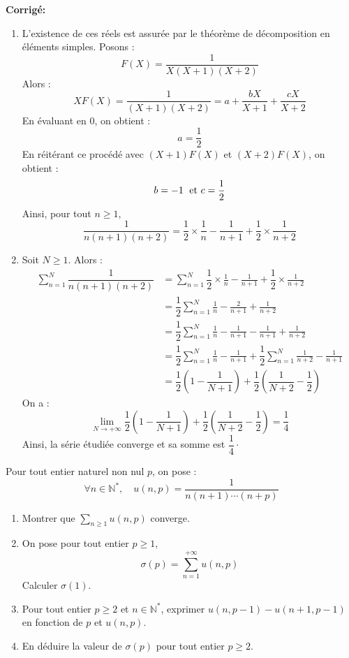 \documentclass[a4paper,twoside,french,10pt]{VcCours}
\newcommand{\corr}{\textbf{Corrigé:}}
\newcommand{\Sum}[2]{\ensuremath{\textstyle{\sum\limits_{#1}^{#2}}}}
\begin{document}
\corr 
\begin{enumerate}
\item L'existence de ces réels est assurée par le théorème de décomposition en éléments simples. Posons :
$$ F(X) = \dfrac{1}{X(X+1)(X+2)}$$
Alors :
$$ XF(X) = \dfrac{1}{(X+1)(X+2)} = a + \dfrac{bX}{X+1} + \dfrac{cX}{X+2}$$
En évaluant en $0$, on obtient :
$$ a = \dfrac{1}{2}$$
En réitérant ce procédé avec $(X+1)F(X)$ et $(X+2)F(X)$, on obtient :
$$ b = -1 \; \hbox{ et } c = \dfrac{1}{2}$$
Ainsi, pour tout $n \geq 1$,
$$  \frac{1}{n(n+1)(n+2)} = \dfrac{1}{2} \times \frac{1}{n} - \frac{1}{n+1}  +\dfrac{1}{2} \times \frac{1}{n+2}$$
\item Soit $N \geq 1$. Alors :
\begin{align*}
\sum_{n=1}^N \dfrac{1}{n(n+1)(n+2)} & = \sum_{n=1}^N  \dfrac{1}{2} \times \frac{1}{n} - \frac{1}{n+1} + \dfrac{1}{2} \times \frac{1}{n+2} \\
& = \dfrac{1}{2} \sum_{n=1}^N  \frac{1}{n} - \frac{2}{n+1}  +\frac{1}{n+2} \\
& = \dfrac{1}{2} \sum_{n=1}^N  \frac{1}{n} - \frac{1}{n+1} - \frac{1}{n+1}  + \frac{1}{n+2} \\
& =  \dfrac{1}{2} \sum_{n=1}^N  \frac{1}{n} - \frac{1}{n+1} +  \dfrac{1}{2} \sum_{n=1}^N   \frac{1}{n+2} - \frac{1}{n+1}  \\
& = \dfrac{1}{2} \left(1 - \dfrac{1}{N+1} \right) + \dfrac{1}{2} \left( \dfrac{1}{N+2} - \dfrac{1}{2} \right)
\end{align*}
On a :
$$ \lim_{N \rightarrow + \infty} \dfrac{1}{2} \left(1 - \dfrac{1}{N+1} \right) + \dfrac{1}{2} \left( \dfrac{1}{N+2} - \dfrac{1}{2} \right) = \dfrac{1}{4}$$
Ainsi, la série étudiée converge et sa somme est $\dfrac{1}{4} \cdot$
\end{enumerate}

\medskip


\begin{Exercice}{} Pour tout entier naturel non nul $p$, on pose :
$$ \forall n \in \mathbb{N}^*, \quad u(n,p) = \frac{1}{n(n+1)\cdots(n+p)}$$

\begin{enumerate}
\item Montrer que $\Sum{n \geq 1}{}  u(n,p)$ converge.
\item On pose pour tout entier $p \geq 1$,
$$ \sigma(p) = \sum_{n=1}^{+ \infty} u(n,p)$$
Calculer $\sigma(1)$.
\item Pour tout entier $p \geq 2$ et $n \in \mathbb{N}^*$, exprimer $u(n,p-1)-u(n+1,p-1)$ en fonction de $p$ et $u(n,p)$.
\item En déduire la valeur de $\sigma(p)$ pour tout entier $p \geq 2$.
\end{enumerate}
\end{Exercice}
\end{document}
